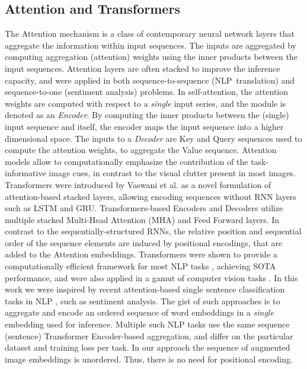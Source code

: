 \documentclass[10pt,twocolumn,letterpaper]{article}
\begin{document}
\subsection{Attention and Transformers}

The Attention mechanism \cite{DBLP:journals/corr/BahdanauCB14} is a class of
contemporary neural network layers that aggregate the information within
input sequences. The inputs are aggregated by computing aggregation
(attention) weights using the inner products between the input sequences.
Attention layers are often stacked to improve the inference capacity, and
were applied in both sequence-to-sequence (NLP\ translation) and
sequence-to-one (sentiment analysis) problems. In self-attention, the
attention weights are computed with respect to a \textit{single} input
series, and the module is denoted as an \textit{Encoder}. By computing the
inner products between the (single) input sequence and itself, the encoder
maps the input sequence into a higher dimensional space. The inputs to a
\textit{Decoder }are Key and Query sequences used to compute the attention
weights, to aggregate the Value sequence. Attention models allow to
computationally emphasize the contribution of the task-informative image
cues, in contrast to the visual clutter present in most images. Transformers
were introduced by Vaswani et al. \cite{AttentionIsAllYouNeed} as a novel
formulation of attention-based stacked layers, allowing encoding sequences
without RNN layers such as LSTM and GRU. Transformers-based Encoders and
Decoders utilize multiple stacked Multi-Head Attention (MHA) and Feed
Forward layers. In contrast to the sequentially-structured RNNs, the
relative position and sequential order of the sequence elements are induced
by positional encodings, that are added to the Attention embeddings.
Transformers were shown to provide a computationally efficient framework for
most NLP tasks \cite{bert}, achieving SOTA performance, and were also
applied in a gamut of computer vision tasks \cite{DETR,16x16}. In this work
we were inspired by recent attention-based single sentence classification
tasks in NLP \cite{bert}, such as sentiment analysis. The gist of such
approaches is to aggregate and encode an ordered sequence of word embeddings
in a \textit{single} embedding used for inference. Multiple such NLP tasks
\cite{bert} use the same sequence (sentence) Transformer Encoder-based
aggregation, and differ on the particular dataset and training loss per
task. In our approach the sequence of augmented image embeddings is
unordered. Thus, there is no need for positional encoding.
\end{document}
